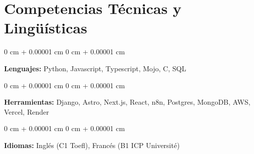 \documentclass[10pt, letterpaper]{article}
\newenvironment{onecolentry}{
    \begin{adjustwidth}{
        0 cm + 0.00001 cm
    }{
        0 cm + 0.00001 cm
    }
}{
    \end{adjustwidth}
} %
\begin{document}
    \section{Competencias Técnicas y Lingüísticas}

    \begin{onecolentry}
        \textbf{Lenguajes:} Python, Javascript, Typescript, Mojo, C, SQL
    \end{onecolentry}
    \vspace{0.1 cm}
    \begin{onecolentry}
        \textbf{Herramientas:} Django, Astro, Next.js, React, n8n, Postgres, MongoDB, AWS, Vercel, Render
    \end{onecolentry}
    \vspace{0.1 cm}
    \begin{onecolentry}
        \textbf{Idiomas:} Inglés (C1 Toefl), Francés (B1 ICP Université)
    \end{onecolentry}
\end{document}
